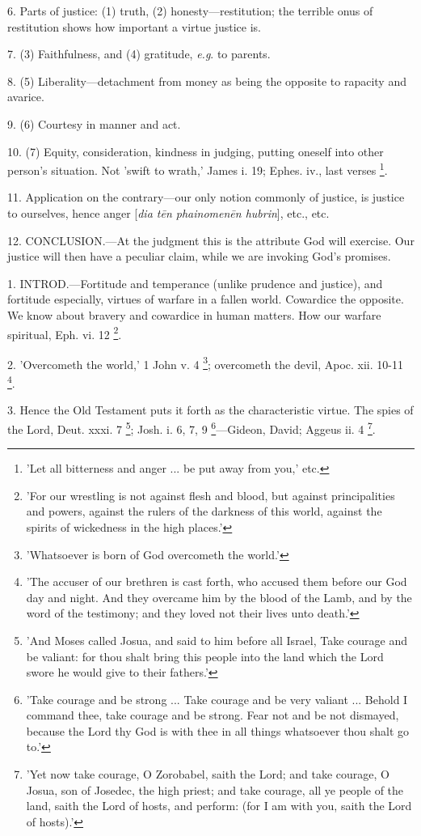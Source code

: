 6. Parts of justice: (1) truth, (2)
honesty—restitution; the terrible onus of restitution shows how
important a virtue justice is.

7. (3) Faithfulness, and (4) gratitude, \emph{e.g}.
to parents.

8. (5) Liberality—detachment from money as
being the opposite to rapacity and avarice.

9. (6) Courtesy in manner and act.

10. (7) Equity, consideration, kindness in
judging, putting oneself into other person's situation. Not
'swift to wrath,' James i. 19; Ephes. iv., last verses \footnote{'Let all bitterness and
anger ... be put away from you,' etc.}.

11. Application on the contrary—our only notion
commonly of justice, is justice to ourselves, hence anger [\emph{dia t\={e}n
phainomen\={e}n hubrin}], etc., etc.

12. CONCLUSION.—At
the judgment this is the attribute God will exercise. Our justice will
then have a peculiar claim, while we are invoking God's promises.


1. INTROD.—Fortitude
and temperance (unlike prudence and justice), and fortitude
especially, virtues of warfare in a fallen world. Cowardice the
opposite. We know about bravery and cowardice in human matters. How
our warfare spiritual, Eph. vi. 12 \footnote{'For our wrestling is
not against flesh and blood, but against principalities and powers,
against the rulers of the darkness of this world, against the spirits
of wickedness in the high places.'}.

2. 'Overcometh the world,' 1 John v. 4 \footnote{'Whatsoever is born of
God overcometh the world.'}; overcometh the devil, Apoc. xii. 10-11 \footnote{'The accuser of our
brethren is cast forth, who accused them before our God day and night.
And they overcame him by the blood of the Lamb, and by the word of the
testimony; and they loved not their lives unto death.'}.

3. Hence the Old Testament puts it forth as the
characteristic virtue. The spies of the Lord, Deut. xxxi. 7 \footnote{'And Moses called Josua,
and said to him before all Israel, Take courage and be valiant: for
thou shalt bring this people into the land which the Lord swore he
would give to their fathers.'}; Josh. i. 6, 7, 9 \footnote{'Take courage and be
strong ... Take courage and be very valiant ... Behold I command thee,
take courage and be strong. Fear not and be not dismayed, because the
Lord thy God is with thee in all things whatsoever thou shalt go to.'}—Gideon,
David; Aggeus ii. 4 \footnote{'Yet now take courage, O
Zorobabel, saith the Lord; and take courage, O Josua, son of Josedec,
the high priest; and take courage, all ye people of the land, saith
the Lord of hosts, and perform: (for I am with you, saith the Lord of
hosts).'}.


